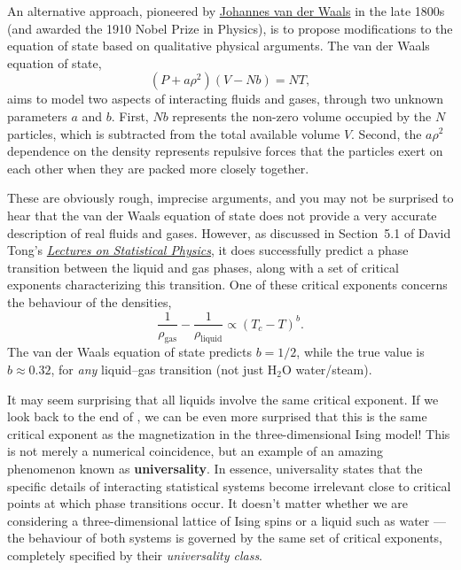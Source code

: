 An alternative approach, pioneered by \href{https://en.wikipedia.org/wiki/Johannes_Diderik_van_der_Waals}{Johannes van der Waals} in the late 1800s (and awarded the 1910 Nobel Prize in Physics), is to propose modifications to the equation of state based on qualitative physical arguments.
The van der Waals equation of state,
\begin{equation*}
  \left(P + a\rho^2\right)\left(V - Nb\right) = NT,
\end{equation*}
aims to model two aspects of interacting fluids and gases, through two unknown parameters $a$ and $b$.
First, $Nb$ represents the non-zero volume occupied by the $N$ particles, which is subtracted from the total available volume $V$.
Second, the $a\rho^2$ dependence on the density represents repulsive forces that the particles exert on each other when they are packed more closely together.

These are obviously rough, imprecise arguments, and you may not be surprised to hear that the van der Waals equation of state does not provide a very accurate description of real fluids and gases.
However, as discussed in Section~5.1 of David Tong's \href{https://www.damtp.cam.ac.uk/user/tong/statphys.html}{\textit{Lectures on Statistical Physics}}, it does successfully predict a phase transition between the liquid and gas phases, along with a set of critical exponents characterizing this transition.
One of these critical exponents concerns the behaviour of the densities,
\begin{equation*}
  \frac{1}{\rho_{\text{gas}}} - \frac{1}{\rho_{\text{liquid}}} \propto \left(T_c - T\right)^b.
\end{equation*}
The van der Waals equation of state predicts $b = 1 / 2$, while the true value is $b \approx 0.32$, for \textit{any} liquid--gas transition (not just H$_2$O water/steam).

It may seem surprising that all liquids involve the same critical exponent.
If we look back to the end of , we can be even more surprised that this is the same critical exponent as the magnetization in the three-dimensional Ising model!
This is not merely a numerical coincidence, but an example of an amazing phenomenon known as \textbf{universality}.
In essence, universality states that the specific details of interacting statistical systems become irrelevant close to critical points at which phase transitions occur.
It doesn't matter whether we are considering a three-dimensional lattice of Ising spins or a liquid such as water --- the behaviour of both systems is governed by the same set of critical exponents, completely specified by their \textit{universality class}.

